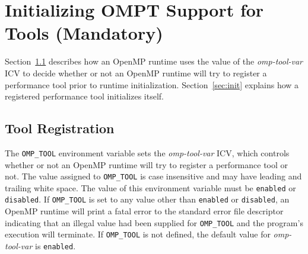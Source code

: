 \documentclass{article}
\begin{document}
\section{Initializing OMPT Support for Tools (Mandatory)}
\label{sec:enabling}

Section~\ref{sec:env} describes how an OpenMP runtime uses the value of the {\em omp-tool-var} ICV to decide whether or not an OpenMP runtime will try to register a performance tool prior to runtime initialization.
Section~\ref{sec:init} explains how a registered performance tool initializes itself.

\subsection{Tool Registration}
\label{sec:env}



The  \verb|OMP_TOOL| environment variable sets the {\em omp-tool-var} ICV, which controls whether or not an OpenMP 
runtime will try to register a performance tool or not. The value assigned to \verb|OMP_TOOL| is 
case insensitive and may have leading and trailing white space.  The value of
this environment variable must be \verb|enabled| or \verb|disabled|.   If  \verb|OMP_TOOL| is set to any value other than \verb|enabled| or \verb|disabled|, an OpenMP runtime will print a fatal error  to the standard error file descriptor indicating that an illegal value had been supplied for \verb|OMP_TOOL| and the program's execution will terminate. If \verb|OMP_TOOL| is not defined, the default value for  {\em omp-tool-var}  is  \verb|enabled|.
\end{document}
